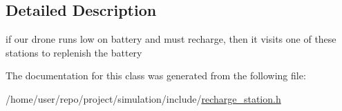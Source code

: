 \subsection{Detailed Description}
if our drone runs low on battery and must recharge, then it visits one of these stations to replenish the battery 

The documentation for this class was generated from the following file\+:\begin{DoxyCompactItemize}
\item 
/home/user/repo/project/simulation/include/\hyperlink{recharge__station_8h}{recharge\+\_\+station.\+h}\end{DoxyCompactItemize}
